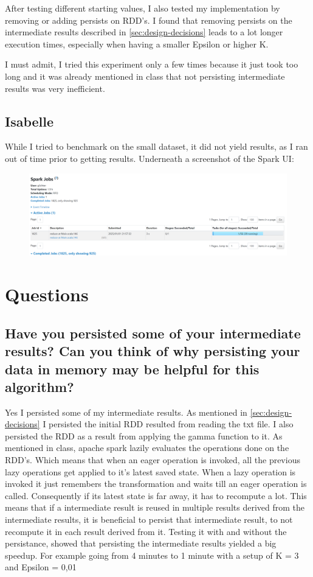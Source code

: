 \documentclass{article}
\begin{document}
\par
After testing different starting values, I also tested my implementation by removing or adding persists on RDD's. I found that removing persists on the intermediate results described in \ref{sec:design-decisions} leads to a lot longer execution times, especially when having a smaller Epsilon or higher K.
\par
I must admit, I tried this experiment only a few times because it just took too long and it was already mentioned in class that not persisting intermediate results was very inefficient.
\par
\subsection{Isabelle}
While I tried to benchmark on the small dataset, it did not yield results, as I ran out of time prior to getting results. Underneath a screenshot of the Spark UI:
\begin{figure}[H]
	\includegraphics[width=\textwidth]{images/sparkscreenshot.png}
\end{figure}
\section{Questions}
\subsection{Have you persisted some of your intermediate results? Can you think of why persisting
	your data in memory may be helpful for this algorithm?}
Yes I persisted some of my intermediate results.
As mentioned in \ref{sec:design-decisions} I persisted the initial RDD resulted from reading the txt file.
I also persisted the RDD as a result from applying the gamma function to it.
As mentioned in class, apache spark lazily evaluates the operations done on the RDD's.
Which means that when an eager operation is invoked, all the previous lazy operations get applied to it's latest saved state.
When a lazy operation is invoked it just remembers the transformation and waits till an eager operation is called.
Consequently if its latest state is far away, it has to recompute a lot. This means that if a intermediate result is reused in multiple results derived from the intermediate results, it is beneficial to persist that intermediate result, to not recompute it in each result derived from it. Testing it with and without the persistance, showed that persisting the intermediate results yielded a big speedup. For example going from 4 minutes to 1 minute with a setup of K = 3 and Epsilon = 0,01
\end{document}
